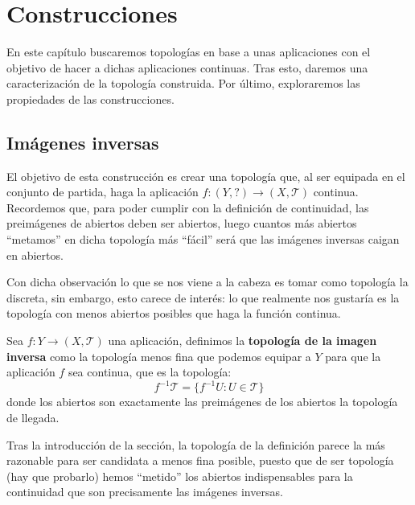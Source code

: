 \chapter{Construcciones}%
\label{cha:construcciones}
En este capítulo buscaremos topologías en base a unas aplicaciones con el objetivo de hacer a dichas aplicaciones continuas. Tras esto, daremos una caracterización de la topología construida. Por último, exploraremos las propiedades de las construcciones.

\section{Imágenes inversas}%
\label{sec:imagenes_inversas}
El objetivo de esta construcción es crear una topología que, al ser equipada en el conjunto de partida, haga la aplicación $f: (Y, ?) \rightarrow \left( X, \mathcal{T} \right)$ continua. Recordemos que, para poder cumplir con la definición de continuidad, las preimágenes de abiertos deben ser abiertos, luego cuantos más abiertos ``metamos'' en dicha topología más ``fácil'' será que las imágenes inversas caigan en abiertos.

Con dicha observación lo que se nos viene a la cabeza es tomar como topología la discreta, sin embargo, esto carece de interés: lo que realmente nos gustaría es la topología con menos abiertos posibles que haga la función continua.

\begin{defi}
Sea $f: Y \rightarrow (X,\mathcal{T})$ una aplicación, definimos la \textbf{topología de la imagen inversa} como la topología menos fina que podemos equipar a $Y$ para que la aplicación $f$ sea continua, que es la topología:
$$
f^{-1} \mathcal{T} = \{f^{-1}U: U \in \mathcal{T}\}
$$
donde los abiertos son exactamente las preimágenes de los abiertos la topología de llegada.
\end{defi}

\begin{obs}
Tras la introducción de la sección, la topología de la definición parece la más razonable para ser candidata a menos fina posible, puesto que de ser topología (hay que probarlo) hemos ``metido'' los abiertos indispensables para la continuidad que son precisamente las imágenes inversas.
\end{obs}

